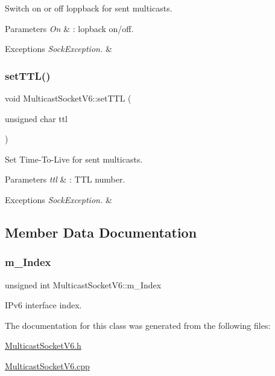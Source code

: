 Switch on or off loppback for sent multicasts. 
\begin{DoxyParams}{Parameters}
{\em On} & \+: lopback on/off. \\
\hline
\end{DoxyParams}

\begin{DoxyExceptions}{Exceptions}
{\em Sock\+Exception.} & \\
\hline
\end{DoxyExceptions}
\mbox{\label{classMulticastSocketV6_af33892d079526e17dfe7cac4128bc0d1}} 
\subsubsection{\texorpdfstring{set\+T\+T\+L()}{setTTL()}}
{\footnotesize\ttfamily void Multicast\+Socket\+V6\+::set\+T\+TL (\begin{DoxyParamCaption}\item[{unsigned char}]{ttl }\end{DoxyParamCaption})}

Set Time-\/\+To-\/\+Live for sent multicasts. 
\begin{DoxyParams}{Parameters}
{\em ttl} & \+: T\+TL number. \\
\hline
\end{DoxyParams}

\begin{DoxyExceptions}{Exceptions}
{\em Sock\+Exception.} & \\
\hline
\end{DoxyExceptions}


\subsection{Member Data Documentation}
\mbox{\label{classMulticastSocketV6_a97955011956119b7e551c3070f521f93}} 
\subsubsection{\texorpdfstring{m\+\_\+\+Index}{m\_Index}}
{\footnotesize\ttfamily unsigned int Multicast\+Socket\+V6\+::m\+\_\+\+Index\hspace{0.3cm}{\ttfamily [protected]}}



I\+Pv6 interface index. 



The documentation for this class was generated from the following files\+:\begin{DoxyCompactItemize}
\item 
\hyperlink{MulticastSocketV6_8h}{Multicast\+Socket\+V6.\+h}\item 
\hyperlink{MulticastSocketV6_8cpp}{Multicast\+Socket\+V6.\+cpp}\end{DoxyCompactItemize}
